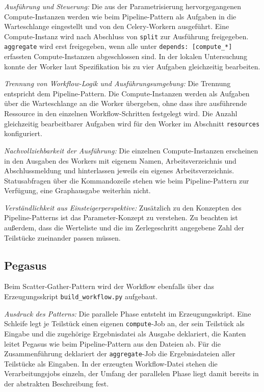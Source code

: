\emph{Ausführung und Steuerung:} Die aus der Parametrisierung
hervorgegangenen Compute-Instanzen werden wie beim Pipeline-Pattern
als Aufgaben in die Warteschlange eingestellt und von den
Celery-Workern ausgeführt. Eine Compute-Instanz wird nach Abschluss
von \texttt{split} zur Ausführung freigegeben. \texttt{aggregate}
wird erst freigegeben, wenn alle unter
\texttt{depends: [compute\_*]} erfassten Compute-Instanzen
abgeschlossen sind. In der lokalen Untersuchung konnte der Worker
laut Spezifikation bis zu vier Aufgaben gleichzeitig bearbeiten.

\emph{Trennung von Workflow-Logik und Ausführungsumgebung:} Die
Trennung entspricht dem Pipeline-Pattern. Die Compute-Instanzen
werden als Aufgaben über die Warteschlange an die Worker übergeben,
ohne dass ihre ausführende Ressource in den einzelnen
Workflow-Schritten festgelegt wird. Die Anzahl gleichzeitig
bearbeitbarer Aufgaben wird für den Worker im Abschnitt
\texttt{resources} konfiguriert.

\emph{Nachvollziehbarkeit der Ausführung:} Die einzelnen
Compute-Instanzen erscheinen in den Ausgaben des Workers mit eigenem
Namen, Arbeitsverzeichnis und Abschlussmeldung und hinterlassen
jeweils ein eigenes Arbeitsverzeichnis. Statusabfragen über die
Kommandozeile stehen wie beim Pipeline-Pattern zur Verfügung, eine
Graphausgabe weiterhin nicht.

\emph{Verständlichkeit aus Einsteigerperspektive:} Zusätzlich zu den
Konzepten des Pipeline-Patterns ist das Parameter-Konzept zu
verstehen. Zu beachten ist außerdem, dass die Werteliste und die im Zerlegeschritt angegebene Zahl der Teilstücke zueinander passen müssen.

\subsection{Pegasus}
\label{sec:lokal:sg:pegasus}

Beim Scatter-Gather-Pattern wird der Workflow ebenfalls über das
Erzeugungsskript \texttt{build\_workflow.py} aufgebaut.

\emph{Ausdruck des Patterns:} Die parallele Phase entsteht im
Erzeugungsskript. Eine Schleife legt je Teilstück einen eigenen
\texttt{compute}-Job an, der sein Teilstück als Eingabe und die
zugehörige Ergebnisdatei als Ausgabe deklariert, die Kanten leitet
Pegasus wie beim Pipeline-Pattern aus den Dateien ab. Für die
Zusammenführung deklariert der \texttt{aggregate}-Job die
Ergebnisdateien aller Teilstücke als Eingaben. In der erzeugten
Workflow-Datei stehen die Verarbeitungsjobs einzeln, der Umfang der
parallelen Phase liegt damit bereits in der abstrakten Beschreibung
fest.

